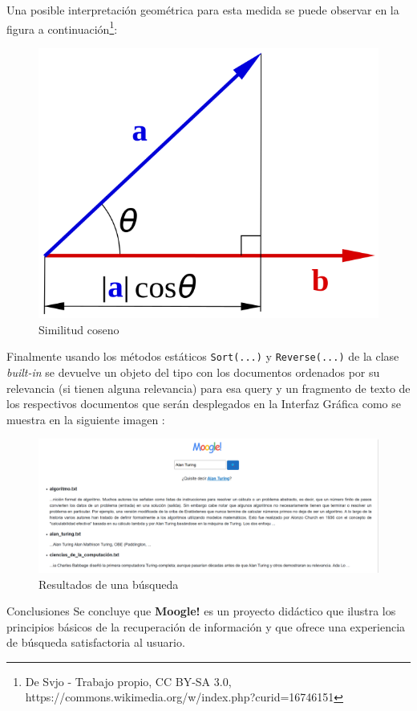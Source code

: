 \documentclass{beamer}
\begin{document}
\begin{frame}
Una posible interpretación geométrica para esta medida se puede observar en la figura a continuación\footnote{De Svjo - Trabajo propio, CC BY-SA 3.0, https://commons.wikimedia.org/w/index.php?curid=16746151}:
\begin{figure}
    \centering
    \includegraphics[width=0.5\linewidth]{605px-Scalar-product-dot-product.svg.png}
    \caption{Similitud coseno}
    \label{fig:similitudcoseno}
\end{figure}

\end{frame}
\begin{frame}
  Finalmente usando los métodos estáticos \texttt{Sort(...)} y \texttt{Reverse(...)} de la clase \textit{built-in}   se devuelve un objeto del tipo  con los documentos ordenados por su relevancia (si tienen alguna relevancia) para esa query y un fragmento de texto de los respectivos documentos que serán desplegados en la Interfaz Gráfica como se muestra en la siguiente imagen : 
  \begin{figure}
      \centering
      \includegraphics[width=1.\linewidth]{result.png}
      \caption{Resultados de una búsqueda}
      \label{fig:resultados}
  \end{figure}
\end{frame} 
\begin{frame}{Conclusiones}
Se concluye que \textbf{Moogle!} es un proyecto didáctico que ilustra los principios básicos de la recuperación de información y que ofrece una experiencia de búsqueda satisfactoria al usuario.
\end{frame}
\end{document}
